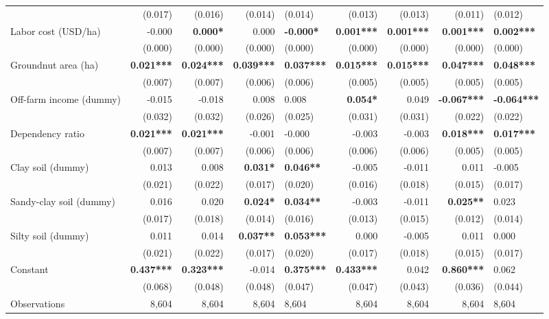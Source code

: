 \documentclass[
]{article}
\begin{document}
\begin{landscape}
\begin{longtable}[t]{lrrrlrrrl}
 & (0.017) & (0.016) & (0.014) & (0.014) & (0.013) & (0.013) & (0.011) & (0.012)\\
Labor cost (USD/ha) & -0.000 & \textbf{0.000*} & 0.000 & \textbf{-0.000*} & \textbf{0.001***} & \textbf{0.001***} & \textbf{0.001***} & \textbf{0.002***}\\
 & (0.000) & (0.000) & (0.000) & (0.000) & (0.000) & (0.000) & (0.000) & (0.000)\\
Groundnut area (ha) & \textbf{0.021***} & \textbf{0.024***} & \textbf{0.039***} & \textbf{0.037***} & \textbf{0.015***} & \textbf{0.015***} & \textbf{0.047***} & \textbf{0.048***}\\
 & (0.007) & (0.007) & (0.006) & (0.006) & (0.005) & (0.005) & (0.005) & (0.005)\\
\addlinespace
Off-farm income (dummy) & -0.015 & -0.018 & 0.008 & 0.008 & \textbf{0.054*} & 0.049 & \textbf{-0.067***} & \textbf{-0.064***}\\
 & (0.032) & (0.032) & (0.026) & (0.025) & (0.031) & (0.031) & (0.022) & (0.022)\\
Dependency ratio & \textbf{0.021***} & \textbf{0.021***} & -0.001 & -0.000 & -0.003 & -0.003 & \textbf{0.018***} & \textbf{0.017***}\\
 & (0.007) & (0.007) & (0.006) & (0.006) & (0.006) & (0.006) & (0.005) & (0.005)\\
Clay soil (dummy) & 0.013 & 0.008 & \textbf{0.031*} & \textbf{0.046**} & -0.005 & -0.011 & 0.011 & -0.005\\
\addlinespace
 & (0.021) & (0.022) & (0.017) & (0.020) & (0.016) & (0.018) & (0.015) & (0.017)\\
Sandy-clay soil (dummy) & 0.016 & 0.020 & \textbf{0.024*} & \textbf{0.034**} & -0.003 & -0.011 & \textbf{0.025**} & 0.023\\
 & (0.017) & (0.018) & (0.014) & (0.016) & (0.013) & (0.015) & (0.012) & (0.014)\\
Silty soil (dummy) & 0.011 & 0.014 & \textbf{0.037**} & \textbf{0.053***} & 0.000 & -0.005 & 0.011 & 0.000\\
 & (0.021) & (0.022) & (0.017) & (0.020) & (0.017) & (0.018) & (0.015) & (0.017)\\
\addlinespace
Constant & \textbf{0.437***} & \textbf{0.323***} & -0.014 & \textbf{0.375***} & \textbf{0.433***} & 0.042 & \textbf{0.860***} & 0.062\\
 & (0.068) & (0.048) & (0.048) & (0.047) & (0.047) & (0.043) & (0.036) & (0.044)\\
\midrule
Observations & 8,604 & 8,604 & 8,604 & 8,604 & 8,604 & 8,604 & 8,604 & 8,604\\

\end{longtable}
\end{landscape}
\end{document}
